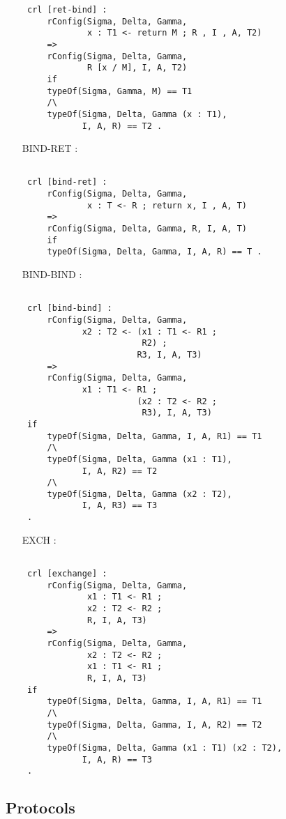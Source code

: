 \documentclass{article}
\begin{document}
\begin{itemize}
\begin{lstlisting}
 crl [ret-bind] : 
     rConfig(Sigma, Delta, Gamma, 
             x : T1 <- return M ; R , I , A, T2) 
     => 
     rConfig(Sigma, Delta, Gamma, 
             R [x / M], I, A, T2) 
     if
     typeOf(Sigma, Gamma, M) == T1
     /\
     typeOf(Sigma, Delta, Gamma (x : T1),  
            I, A, R) == T2 .

 \end{lstlisting} 
\item[BIND-RET]:
\begin{lstlisting}            

 crl [bind-ret] : 
     rConfig(Sigma, Delta, Gamma, 
             x : T <- R ; return x, I , A, T) 
     => 
     rConfig(Sigma, Delta, Gamma, R, I, A, T)
     if 
     typeOf(Sigma, Delta, Gamma, I, A, R) == T . 

 \end{lstlisting} 
\item[BIND-BIND]:
\begin{lstlisting}     

 crl [bind-bind] : 
     rConfig(Sigma, Delta, Gamma, 
            x2 : T2 <- (x1 : T1 <- R1 ; 
                        R2) ; 
                       R3, I, A, T3)
     => 
     rConfig(Sigma, Delta, Gamma, 
            x1 : T1 <- R1 ; 
                       (x2 : T2 <- R2 ; 
                        R3), I, A, T3)
 if
     typeOf(Sigma, Delta, Gamma, I, A, R1) == T1
     /\
     typeOf(Sigma, Delta, Gamma (x1 : T1), 
            I, A, R2) == T2
     /\ 
     typeOf(Sigma, Delta, Gamma (x2 : T2), 
            I, A, R3) == T3 
 .              

 \end{lstlisting} 
\item[EXCH]:
\begin{lstlisting}

 crl [exchange] : 
     rConfig(Sigma, Delta, Gamma, 
             x1 : T1 <- R1 ; 
             x2 : T2 <- R2 ; 
             R, I, A, T3)
     => 
     rConfig(Sigma, Delta, Gamma, 
             x2 : T2 <- R2 ; 
             x1 : T1 <- R1 ; 
             R, I, A, T3)
 if
     typeOf(Sigma, Delta, Gamma, I, A, R1) == T1
     /\
     typeOf(Sigma, Delta, Gamma, I, A, R2) == T2
     /\
     typeOf(Sigma, Delta, Gamma (x1 : T1) (x2 : T2), 
            I, A, R) == T3 
 .

\end{lstlisting} 
\end{itemize}

\subsection{Protocols}
\end{document}
